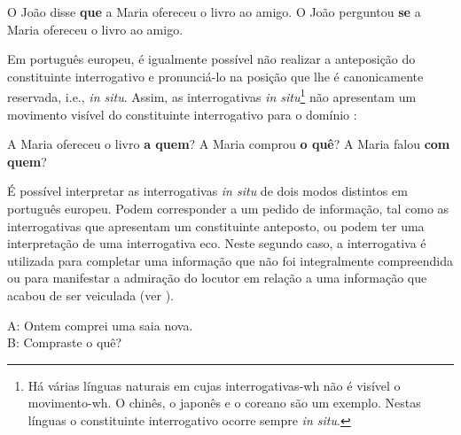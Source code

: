 \documentclass[output=paper]{LSP/langsci}
\begin{document}
\ea\label{ex:lobo_7}
\ea\label{ex:lobo_7a} O João disse \textbf{que} a Maria ofereceu o livro ao amigo.
\ex\label{ex:lobo_7b} O João perguntou \textbf{se} a Maria ofereceu o livro ao amigo.
\zl

Em português europeu, é igualmente possível não realizar a anteposição do constituinte interrogativo e pronunciá-lo na posição que lhe é canonicamente reservada, i.e., \textit{in situ}. Assim, as interrogativas \textit{in situ}\footnote{Há várias línguas naturais em cujas interrogativas-wh não é visível o movimento-wh. O chinês, o japonês e o coreano são um exemplo. Nestas línguas o constituinte interrogativo ocorre sempre \textit{in situ}.} não apresentam um movimento visível do constituinte interrogativo para o domínio :

\ea\label{ex:lobo_8}
\ea\label{ex:lobo_8a} A Maria ofereceu o livro \textbf{a quem}?
\ex\label{ex:lobo_8b} A Maria comprou \textbf{o quê}?
\ex\label{ex:lobo_8c} A Maria falou \textbf{com quem}?
\zl

É possível interpretar as interrogativas \textit{in situ} de dois modos distintos em português europeu. Podem corresponder a um pedido de informação, tal como as interrogativas que apresentam um constituinte anteposto, ou podem ter uma interpretação de uma interrogativa eco. Neste segundo caso, a interrogativa é utilizada para completar uma informação que não foi integralmente compreendida ou para manifestar a admiração do locutor em relação a uma informação que acabou de ser veiculada (ver \citealt{mateus_etal2003}).\largerpage[1]

\ea\label{ex:lobo_9} A: Ontem comprei uma saia nova.\\B: Compraste o quê?\z
\end{document}
